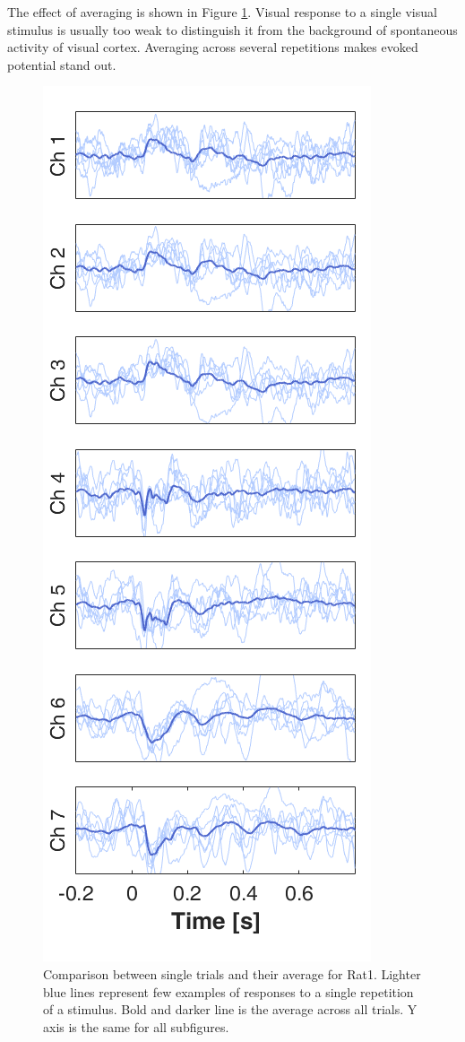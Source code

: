 \documentclass{pracalicmgr}
\begin{document}
   The effect of averaging is shown in Figure \ref{rys:usrednianie}. Visual response to a single visual stimulus is usually too weak to distinguish it from the background of spontaneous activity of visual cortex. Averaging across several repetitions makes evoked potential stand out.
   \begin{figure}[H]
   	\begin{center}
   		\includegraphics[scale=0.6]{usrednianie3.png}
   	\end{center}
   	\caption{ Comparison between single trials and their average for Rat1. Lighter blue lines represent few examples of responses to a single repetition of a stimulus. Bold and darker line is the average across all trials. Y axis is the same for all subfigures. }
   	\label{rys:usrednianie}
   \end{figure} 
   
\end{document}
